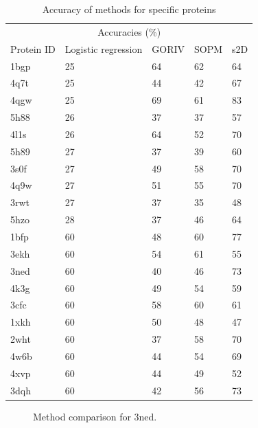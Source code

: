 \documentclass{article}
\begin{document}
\begin{table}[t]
  \caption{Accuracy of methods for specific proteins}
  \centering
  \begin{tabular}{lllll}
    \toprule
    \multicolumn{5}{c}{Accuracies (\%)}\\
    \cmidrule{2-5}
    Protein ID & Logistic regression & GORIV & SOPM & s2D\\
    \midrule
    1bgp & 25 & 64&62&64 \\
    4q7t & 25 & 44 & 42 & 67 \\
    4qgw & 25 & 69 & 61 & 83 \\
    5h88 & 26 & 37&37&57 \\
    4l1s & 26 & 64&52&70 \\
    
    5h89 & 27 & 37&39&60 \\
    3s0f & 27 & 49 & 58 & 70 \\
    4q9w & 27 & 51&55&70 \\
    3rwt & 27 & 37&35&48 \\
    5hzo & 28 & 37 & 46 & 64 \\
    \midrule
    1bfp & 60 & 48&60&77 \\
    3ekh & 60 & 54&61&55 \\
    3ned & 60 & 40&46&73 \\
    4k3g & 60 & 49&54&59 \\
    3cfc & 60 & 58 &60&61 \\
    
    1xkh & 60 & 50&48&47 \\
    2wht & 60 & 37&58&70 \\
    4w6b & 60 & 44&54&69 \\
    4xvp & 60 & 44&49&52 \\
    3dqh & 60 & 42&56&73 \\
    \bottomrule
  \end{tabular}
\end{table}

\begin{figure}[h]
  \centering
  \caption{Method comparison for 3ned. }
\end{figure}
\end{document}
